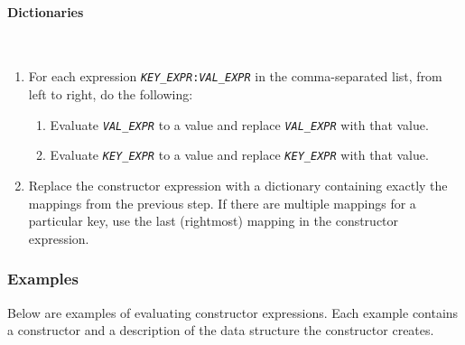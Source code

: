 \documentclass{article}
\newcommand{\expr}[1]{\texttt{#1}}
\newcommand{\mvar}[1]{\expr{\emph{\uppercase{#1}}}}
\newcommand{\myparagraph}[1]{\paragraph{#1} \ifhevea\else \strut \\ \strut \fi}
\begin{document}
  \myparagraph{Dictionaries}
  \begin{enumerate}
    \item
    For each expression \expr{\mvar{KEY\_EXPR}:\mvar{VAL\_EXPR}} in the comma-separated list, from left to right, do the following:
    \begin{enumerate}
      \item
      Evaluate \mvar{VAL\_EXPR} to a value and replace \mvar{VAL\_EXPR} with that value.

      \item
      Evaluate \mvar{KEY\_EXPR} to a value and replace \mvar{KEY\_EXPR} with that value.

    \end{enumerate}

    \item
    Replace the constructor expression with a dictionary containing exactly the
    mappings from the previous step. If there are multiple mappings for a particular
    key, use the last (rightmost) mapping in the constructor expression.

  \end{enumerate}

\subsubsection{Examples}

  Below are examples of evaluating constructor expressions. Each example contains a constructor and a description of the data structure the constructor creates.
\end{document}
